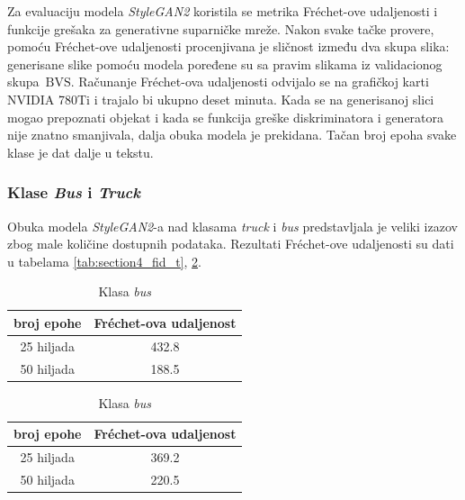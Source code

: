 \documentclass[12pt,oneside]{memoir}
\newcommand{\bvs}{\ensuremath{\,\textrm{BVS}}}
\begin{document}
Za evaluaciju modela \textit{StyleGAN2} koristila se metrika Fréchet-ove udaljenosti i funkcije grešaka za generativne suparničke mreže. Nakon svake tačke provere, pomoću Fréchet-ove udaljenosti procenjivana je sličnost između dva skupa slika: generisane slike pomoću modela poređene su sa pravim slikama iz validacionog skupa \bvs. Računanje Fréchet-ova udaljenosti odvijalo se na grafičkoj karti NVIDIA 780Ti i trajalo bi ukupno deset minuta. Kada se na generisanoj slici mogao prepoznati objekat i kada se funkcija greške diskriminatora i generatora nije znatno smanjivala, dalja obuka modela je prekidana. Tačan broj epoha svake klase je dat dalje u tekstu.


\subsubsection{Klase \textit{Bus} i \textit{Truck}}

Obuka modela \textit{StyleGAN2}-a nad klasama \textit{truck} i \textit{bus} predstavljala je veliki izazov zbog male količine dostupnih podataka. 
Rezultati Fréchet-ove udaljenosti su dati u tabelama \ref{tab:section4_fid_t}, \ref{tab:section4_fid_b}.

\begin{table}[!htb]
    \begin{minipage}{.5\linewidth}
      \caption{Klasa \textit{truck}}\label{tab:section4_fid_t}
      \centering
        \begin{tabular}{c|c}
        broj epohe &  Fréchet-ova udaljenost \\
        \hline
        25 hiljada & 432.8 \\
        \hline
        50 hiljada & 188.5 \\
        \end{tabular}
    \end{minipage}
    \begin{minipage}{.5\linewidth}
      \centering
        \caption{Klasa \textit{bus}}\label{tab:section4_fid_b}
        \begin{tabular}{c|c}
        broj epohe &  Fréchet-ova udaljenost \\
        \hline
        25 hiljada & 369.2 \\
        \hline
        50 hiljada & 220.5 \\
        \end{tabular}
    \end{minipage} 
\end{table}
\end{document}
